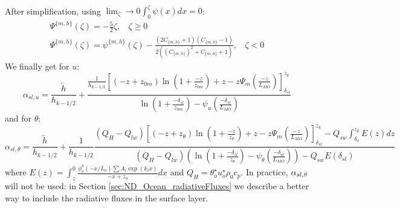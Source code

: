 \begin{subappendices}
\begin{equation}
\begin{aligned}
\end{aligned}
\end{equation}
After simplification, using $\lim_\zeta\to0 \int_0^\zeta\psi(x)dx = 0$:
\begin{equation}
\begin{aligned}
\Psi^{\{m,h\}}(\zeta)= -\frac{5}{2}\zeta, ~~~~ \zeta \geq 0 \\
	\Psi^{\{m,h\}}(\zeta)=
	\psi^{\{m,h\}}(\zeta)
	- \frac{(2C_{\{m,h\}}+1)(C_{\{m,h\}} - 1)}
	{2\left((C_{\{m,h\}})^2 + C_{\{m,h\}} + 1\right)}, ~~~~ \zeta < 0
\end{aligned}
\end{equation}
We finally get for $u$:
\begin{equation}
	\alpha_{sl, u} = \frac{\widetilde{h}}{h_{k-1/2}} +
	\frac{\frac{1}{{h_{k-1/2}}}
    \left[
	    (-z+z_{0m})\ln(1+\frac{-z}{z_{0m}})+z
    -
    z \Psi_m(\frac{-z}{L_{MO}}) \right]_{\delta_{sl}}^{z_k}
    }{\ln(1+\frac{-\delta_{sl}}{z_{0m}})- \psi_u(\frac{-\delta_{sl}}{L_{MO}})
    }
\end{equation}
and for $\theta$:
\begin{equation}
	\alpha_{sl, \theta} =  \frac{\widetilde{h}}{h_{k-1/2}} +
	\frac{1}{{h_{k-1/2}}}\frac{(Q_H -
		Q_{lw})
    \left[
	    (-z+z_{\theta})\ln(1+\frac{-z}{z_{\theta}})+z
    -
    z \Psi_m(\frac{-z}{L_{MO}}) \right]_{\delta_{sl}}^{z_k}
	- Q_{sw} \int_{\delta_o}^{z_k}
		E(z) dz
    }{(Q_H - Q_{lw})
	    \left(\ln(1+\frac{-\delta_{sl}}{z_{\theta}})-
	    \psi_\theta(\frac{-\delta_{sl}}{L_{MO}})\right)
	    -Q_{sw} E(\delta_{sl})
    }
\end{equation}
where $E(z) = \int_{z}^0 \frac{\phi^h_o(-x/L_o)
		\sum A_i \exp (k_i x)
		}{-x + z_{u}}dx$
and $Q_H = \theta_o^{\star}u_o^{\star}\rho_0 c_p$.
In practice, $\alpha_{sl, \emphase{\theta}}$ will not be used: in Section
\ref{sec:ND_Ocean_radiativeFluxes} we describe a better way to
include the radiative fluxes in the surface layer.
\end{subappendices}
